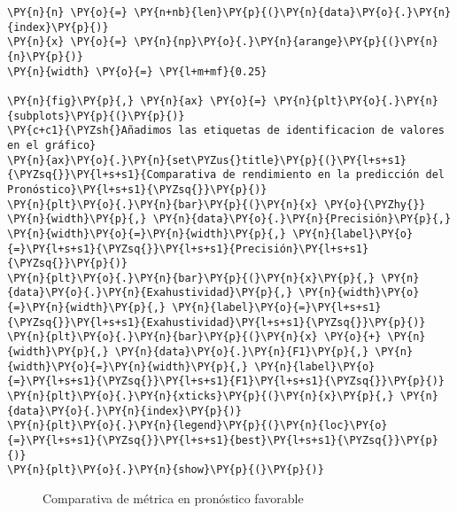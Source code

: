     \begin{tcolorbox}[breakable, size=fbox, boxrule=1pt, pad at break*=1mm,colback=cellbackground, colframe=cellborder]
\begin{Verbatim}[commandchars=\\\{\}]
\PY{n}{n} \PY{o}{=} \PY{n+nb}{len}\PY{p}{(}\PY{n}{data}\PY{o}{.}\PY{n}{index}\PY{p}{)}
\PY{n}{x} \PY{o}{=} \PY{n}{np}\PY{o}{.}\PY{n}{arange}\PY{p}{(}\PY{n}{n}\PY{p}{)}
\PY{n}{width} \PY{o}{=} \PY{l+m+mf}{0.25}

\PY{n}{fig}\PY{p}{,} \PY{n}{ax} \PY{o}{=} \PY{n}{plt}\PY{o}{.}\PY{n}{subplots}\PY{p}{(}\PY{p}{)}
\PY{c+c1}{\PYZsh{}Añadimos las etiquetas de identificacion de valores en el gráfico}
\PY{n}{ax}\PY{o}{.}\PY{n}{set\PYZus{}title}\PY{p}{(}\PY{l+s+s1}{\PYZsq{}}\PY{l+s+s1}{Comparativa de rendimiento en la predicción del Pronóstico}\PY{l+s+s1}{\PYZsq{}}\PY{p}{)}
\PY{n}{plt}\PY{o}{.}\PY{n}{bar}\PY{p}{(}\PY{n}{x} \PY{o}{\PYZhy{}} \PY{n}{width}\PY{p}{,} \PY{n}{data}\PY{o}{.}\PY{n}{Precisión}\PY{p}{,} \PY{n}{width}\PY{o}{=}\PY{n}{width}\PY{p}{,} \PY{n}{label}\PY{o}{=}\PY{l+s+s1}{\PYZsq{}}\PY{l+s+s1}{Precisión}\PY{l+s+s1}{\PYZsq{}}\PY{p}{)}
\PY{n}{plt}\PY{o}{.}\PY{n}{bar}\PY{p}{(}\PY{n}{x}\PY{p}{,} \PY{n}{data}\PY{o}{.}\PY{n}{Exahustividad}\PY{p}{,} \PY{n}{width}\PY{o}{=}\PY{n}{width}\PY{p}{,} \PY{n}{label}\PY{o}{=}\PY{l+s+s1}{\PYZsq{}}\PY{l+s+s1}{Exahustividad}\PY{l+s+s1}{\PYZsq{}}\PY{p}{)}
\PY{n}{plt}\PY{o}{.}\PY{n}{bar}\PY{p}{(}\PY{n}{x} \PY{o}{+} \PY{n}{width}\PY{p}{,} \PY{n}{data}\PY{o}{.}\PY{n}{F1}\PY{p}{,} \PY{n}{width}\PY{o}{=}\PY{n}{width}\PY{p}{,} \PY{n}{label}\PY{o}{=}\PY{l+s+s1}{\PYZsq{}}\PY{l+s+s1}{F1}\PY{l+s+s1}{\PYZsq{}}\PY{p}{)}
\PY{n}{plt}\PY{o}{.}\PY{n}{xticks}\PY{p}{(}\PY{n}{x}\PY{p}{,} \PY{n}{data}\PY{o}{.}\PY{n}{index}\PY{p}{)}
\PY{n}{plt}\PY{o}{.}\PY{n}{legend}\PY{p}{(}\PY{n}{loc}\PY{o}{=}\PY{l+s+s1}{\PYZsq{}}\PY{l+s+s1}{best}\PY{l+s+s1}{\PYZsq{}}\PY{p}{)}
\PY{n}{plt}\PY{o}{.}\PY{n}{show}\PY{p}{(}\PY{p}{)}
\end{Verbatim}
\end{tcolorbox}

\begin{center}
    	\begin{figure}[H]
	\centering
	\caption{Comparativa de métrica en pronóstico favorable}
	\label{fig:cmpf}
	\end{figure}
\end{center}
    
